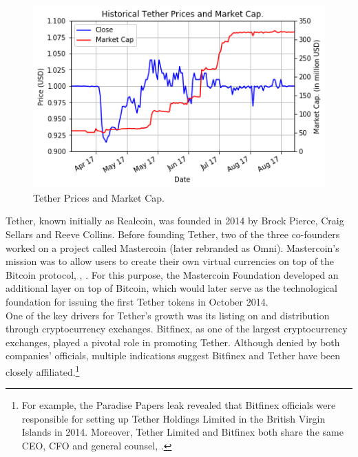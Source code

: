 \documentclass[conference]{IEEEtran}
\begin{document}
\begin{figure}[htbp]
	\centerline{
		\includegraphics[width=\linewidth]{tetherPrices.png}
		}
	\caption{Tether Prices and Market Cap.}
	\label{fig:tether}
\end{figure}

Tether, known initially as Realcoin, was founded in 2014 by Brock Pierce, Craig Sellars and Reeve Collins. Before founding Tether, two of the three co-founders worked on a project called Mastercoin (later rebranded as Omni). Mastercoin's mission was to allow users to create their own virtual currencies on top of the Bitcoin protocol, \cite{Zynis}\cite{Sellars}, \cite{Roth}. For this purpose, the Mastercoin Foundation developed an additional layer on top of Bitcoin, which would later serve as the technological foundation for issuing the first Tether tokens in October 2014.\\

One of the key drivers for Tether's growth was its listing on and distribution through cryptocurrency exchanges. Bitfinex, as one of the largest cryptocurrency exchanges, played a pivotal role in promoting Tether. Although denied by both companies' officials, multiple indications suggest Bitfinex and Tether have been closely affiliated.\footnote{For example, the Paradise Papers leak revealed that Bitfinex officials were responsible for setting up Tether Holdings Limited in the British Virgin Islands in 2014. Moreover, Tether Limited and Bitfinex both share the same CEO, CFO and general counsel, \cite{Tether2}\cite{Bitfinex}.}\\
\end{document}

